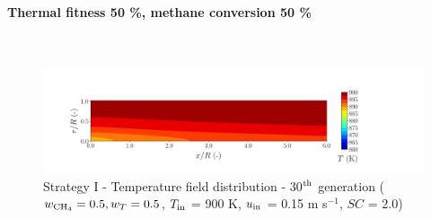 \documentclass[preprint,12pt]{elsarticle}
\begin{document}


\clearpage





\paragraph{Thermal fitness 50 \%, methane conversion 50 \%} \hspace{0pt} \\
\noindent 


%

\begin{figure}[h!]
\centering
\includegraphics[width=190mm]{results/5/50C_50T/GEN30-TFIELD.png}
\caption{\label{fig:5R5050G30-TField} Strategy I - Temperature field distribution - 30$^{\rm{th}}$ generation ($w_{\rm{CH_4}} = 0.5, w_T = 0.5$, $T_{\rm{in}}$ = 900 K, $u_{\rm{in}}$ = 0.15 m s$^{-1}$, $SC$ = 2.0)}
\end{figure}
\end{document}
